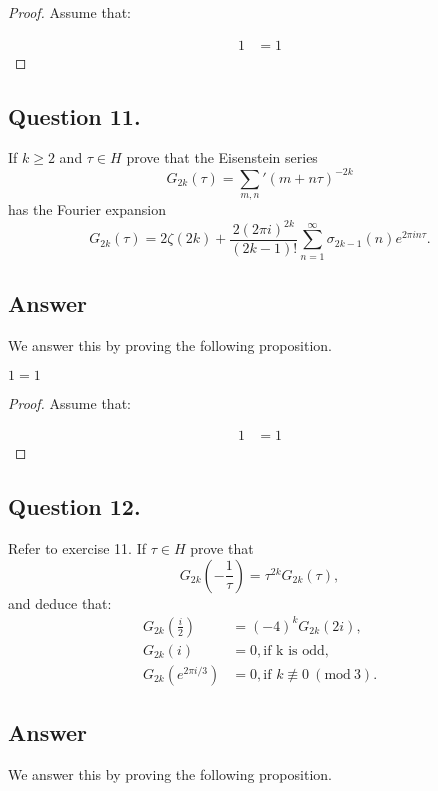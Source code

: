 \begin{proof}
    Assume that:

    \begin{align*}
        1 &= 1
    \end{align*}

\end{proof}


\subsection{Question 11.}
\noindent
If $k \geq 2$ and $\tau \in H$ prove that the Eisenstein series
\[
    G_{2k}(\tau) = \sum_{m,n}{'}(m + n\tau)^{-2k}
\]
has the Fourier expansion
\[
    G_{2k}(\tau) = 2\zeta(2k) +\frac{2(2 \pi i)^{2k}}{(2k-1)!}\sum_{n=1}^{\infty}\sigma_{2k-1}(n)e^{2\pi i n \tau}.
\]

\subsection*{Answer}
\noindent
We answer this by proving the following proposition.

\begin{proposition}
    $1=1$
\end{proposition}

\begin{proof}
    Assume that:

    \begin{align*}
        1 &= 1
    \end{align*}

\end{proof}


\subsection{Question 12.}
\noindent
Refer to exercise 11. If $\tau \in H$ prove that
\[
    G_{2k}(-\frac{1}{\tau}) = \tau^{2k} G_{2k}(\tau),
\]
and deduce that:
\begin{align*}
    G_{2k}(\frac{i}{2}) &= (-4)^{k}G_{2k}(2i), \\
    G_{2k}(i) &=0 , \text{if k is odd,} \\
    G_{2k}(e^{2\pi i/3}) &=0 , \text{if } k \not\equiv 0\ (\textrm{mod}\ 3).
\end{align*}


\subsection*{Answer}
\noindent
We answer this by proving the following proposition.

